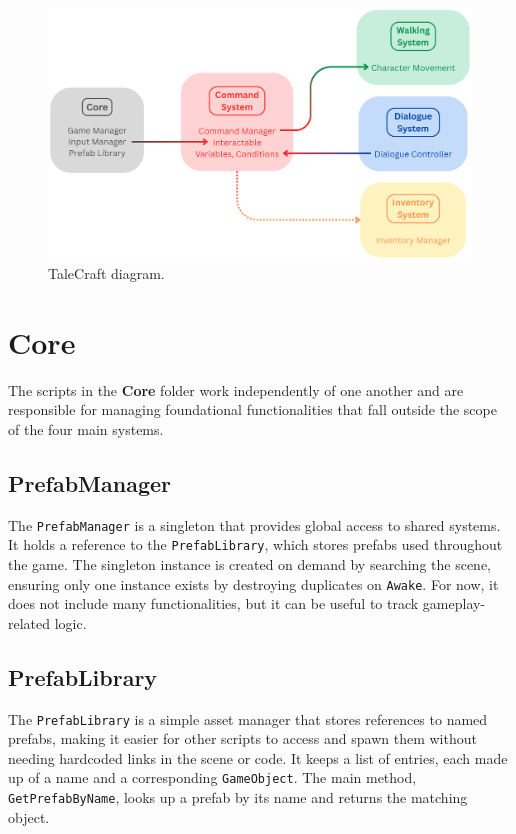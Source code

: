 \begin{figure}[H]
\centering
\includegraphics[width=0.85\linewidth]{img/framework_systems.png}
\caption{TaleCraft diagram.}
\label{fig:TaleCraft}
\end{figure}

\section{Core}
\label{Core}
The scripts in the \textbf{Core} folder work independently of one another and are responsible for managing foundational functionalities that fall outside the scope of the four main systems. 

\subsection{PrefabManager}
The \verb|PrefabManager| is a singleton that provides global access to shared systems. It holds a reference to the \verb|PrefabLibrary|, which stores prefabs used throughout the game. The singleton instance is created on demand by searching the scene, ensuring only one instance exists by destroying duplicates on \verb|Awake|. For now, it does not include many functionalities, but it can be useful to track gameplay-related logic.

\subsection{PrefabLibrary}
The \verb|PrefabLibrary| is a simple asset manager that stores references to named prefabs, making it easier for other scripts to access and spawn them without needing hardcoded links in the scene or code. It keeps a list of entries, each made up of a name and a corresponding \verb|GameObject|. The main method, \verb|GetPrefabByName|, looks up a prefab by its name and returns the matching object.

